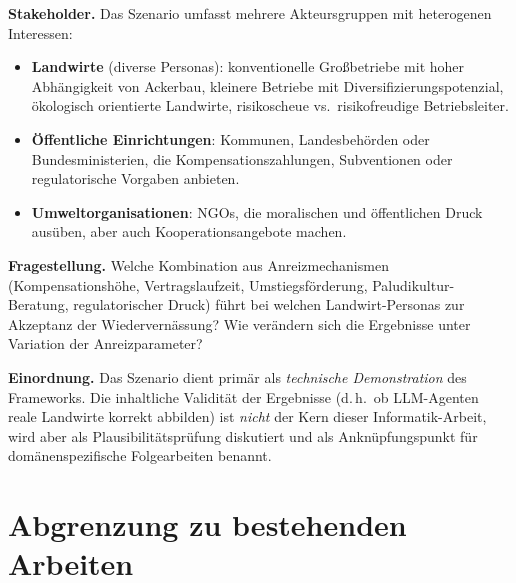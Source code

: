 \documentclass[12pt, a4paper]{article}
\begin{document}
\textbf{Stakeholder.} Das Szenario umfasst mehrere Akteursgruppen mit heterogenen Interessen:
\begin{itemize}
    \item \textbf{Landwirte} (diverse Personas): konventionelle Großbetriebe mit hoher Abhängigkeit von Ackerbau, kleinere Betriebe mit Diversifizierungspotenzial, ökologisch orientierte Landwirte, risikoscheue vs.\ risikofreudige Betriebsleiter.
    \item \textbf{Öffentliche Einrichtungen}: Kommunen, Landesbehörden oder Bundesministerien, die Kompensationszahlungen, Subventionen oder regulatorische Vorgaben anbieten.
    \item \textbf{Umweltorganisationen}: NGOs, die moralischen und öffentlichen Druck ausüben, aber auch Kooperationsangebote machen.
\end{itemize}

\textbf{Fragestellung.} Welche Kombination aus Anreizmechanismen (Kompensationshöhe, Vertragslaufzeit, Umstiegsförderung, Paludikultur-Beratung, regulatorischer Druck) führt bei welchen Landwirt-Personas zur Akzeptanz der Wiedervernässung? Wie verändern sich die Ergebnisse unter Variation der Anreizparameter?

\textbf{Einordnung.} Das Szenario dient primär als \textit{technische Demonstration} des Frameworks. Die inhaltliche Validität der Ergebnisse (d.\,h.\ ob LLM-Agenten reale Landwirte korrekt abbilden) ist \textit{nicht} der Kern dieser Informatik-Arbeit, wird aber als Plausibilitätsprüfung diskutiert und als Anknüpfungspunkt für domänenspezifische Folgearbeiten benannt.

\section{Abgrenzung zu bestehenden Arbeiten}
\end{document}
